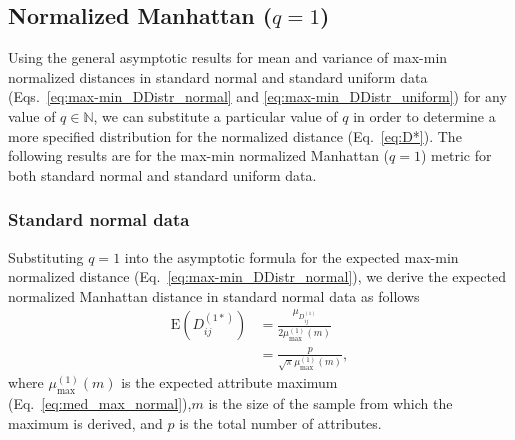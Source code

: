 \documentclass[aoas]{imsart}
\begin{document}
\subsection{Normalized Manhattan \texorpdfstring{($q=1$)}{}}

Using the general asymptotic results for mean and variance of max-min normalized distances in standard normal and standard uniform data (Eqs.~\ref{eq:max-min_DDistr_normal} and \ref{eq:max-min_DDistr_uniform}) for any value of $q \in \mathbb{N}$, we can substitute a particular value of $q$ in order to determine a more specified distribution for the normalized distance (Eq.~\ref{eq:D*}). The following results are for the max-min normalized Manhattan ($q = 1$) metric for both standard normal and standard uniform data.

\subsubsection{Standard normal data}

Substituting $q=1$ into the asymptotic formula for the expected max-min normalized distance (Eq.~\ref{eq:max-min_DDistr_normal}), we derive the expected normalized Manhattan distance in standard normal data as follows
%
\begin{equation}\label{eq:max-min_mean_normal_manhattan}
\begin{aligned}
\text{E}\left(D^{(1*)}_{ij}\right) &= \frac{\mu_{D^{(1)}_{ij}}}{2\mu^{(1)}_\text{max}(m)} \\
&= \frac{p}{\sqrt{\pi}\mu^{(1)}_\text{max}(m)},
\end{aligned}
\end{equation}
%
where $\mu^{(1)}_\text{max}(m)$ is the expected attribute maximum (Eq.~\ref{eq:med_max_normal}),$m$ is the size of the sample from which the maximum is derived, and $p$ is the total number of attributes.
\end{document}
